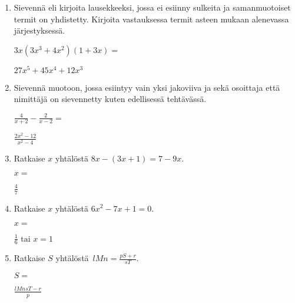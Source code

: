 \documentclass[finnish, a4paper, 12pt]{article}
\begin{document}
\begin{enumerate}[leftmargin=*]
		\vspace{8pt}
		
		\item %
		Sievennä eli kirjoita lausekkeeksi, jossa ei esiinny sulkeita ja 
		samanmuotoiset termit on yhdistetty. 
		Kirjoita vastauksessa termit asteen mukaan alenevassa järjestyksessä. 
		
		\(
		\displaystyle
		3x(3x^3 + 4x^2)(1 + 3x) = 
		\) %
		\begin{version:withAnswers}
		\( 27x^5 +45x^4 +12x^3 \)
		\end{version:withAnswers}
		
		\vspace{8pt}
		
		\item %
		Sievennä %
		muotoon, jossa esiintyy vain yksi jakoviiva ja sekä osoittaja
		että nimittäjä on sievennetty kuten edellisessä tehtävässä.
		
		\(
		\displaystyle
		\frac{4}{x+2}- \frac{2}{x - 2} =
		\) %
		\begin{version:withAnswers}
		\( \frac{2x^2 - 12}{x^2  - 4} \)
		\end{version:withAnswers}
		
		\vspace{8pt}
		
		\item %
		Ratkaise \(x\) yhtälöstä \(8x - (3x+1) = 7 - 9x\).
		
		\(
		x = 
		\)	%
		\begin{version:withAnswers}
		 \( \frac{4}{7} \)
		\end{version:withAnswers}
		\vspace{8pt}
		
		\item %
		Ratkaise \(x\) yhtälöstä \(6 x^2  - 7 x + 1= 0\).
		
		\(
		x = 		
		\)	%
		
		\begin{version:withAnswers}
		\(\frac{1}{6} \text{  tai } x = 1\)
		\end{version:withAnswers}
		\vspace{8pt}
		
		\item %
		Ratkaise \(S\) yhtälöstä 
		\(
		\displaystyle \,
		lMn = \frac{pS+r}{sT} .
		\)	
		
		\(
		S = 
		\) %
		\begin{version:withAnswers}
		\( \frac{lMnsT -r}{p}\)
		\end{version:withAnswers}
		
	\end{enumerate}
	
	
\end{document}
